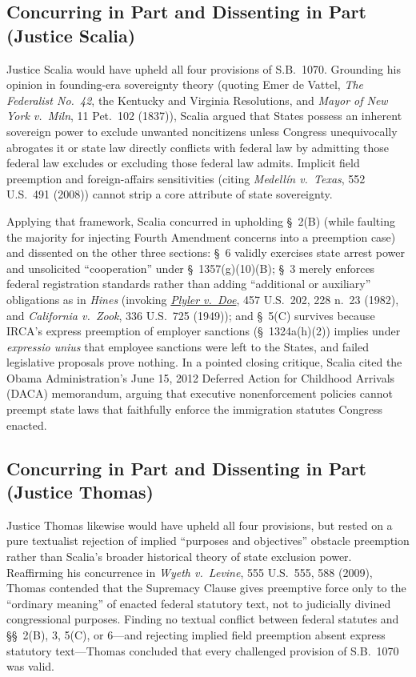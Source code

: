 \documentclass[12pt]{article}
\begin{document}
\subsection{Concurring in Part and Dissenting in Part (Justice Scalia)}

Justice Scalia would have upheld all four provisions of S.B.\ 1070. Grounding his opinion in founding-era sovereignty theory (quoting Emer de Vattel, \textit{The Federalist No.\ 42}, the Kentucky and Virginia Resolutions, and \textit{Mayor of New York v.\ Miln}, 11 Pet.\ 102 (1837)), Scalia argued that States possess an inherent sovereign power to exclude unwanted noncitizens unless Congress unequivocally abrogates it or state law directly conflicts with federal law by admitting those federal law excludes or excluding those federal law admits. Implicit field preemption and foreign-affairs sensitivities (citing \textit{Medell\'{i}n v.\ Texas}, 552 U.S.\ 491 (2008)) cannot strip a core attribute of state sovereignty.

Applying that framework, Scalia concurred in upholding \S~2(B) (while faulting the majority for injecting Fourth Amendment concerns into a preemption case) and dissented on the other three sections: \S~6 validly exercises state arrest power and unsolicited ``cooperation'' under \S~1357(g)(10)(B); \S~3 merely enforces federal registration standards rather than adding ``additional or auxiliary'' obligations as in \textit{Hines} (invoking \href{https://supreme.justia.com/cases/federal/us/457/202/}{\textit{Plyler v.\ Doe}}, 457 U.S.\ 202, 228 n.\ 23 (1982), and \textit{California v.\ Zook}, 336 U.S.\ 725 (1949)); and \S~5(C) survives because IRCA's express preemption of employer sanctions (\S~1324a(h)(2)) implies under \textit{expressio unius} that employee sanctions were left to the States, and failed legislative proposals prove nothing. In a pointed closing critique, Scalia cited the Obama Administration's June 15, 2012 Deferred Action for Childhood Arrivals (DACA) memorandum, arguing that executive nonenforcement policies cannot preempt state laws that faithfully enforce the immigration statutes Congress enacted.

\subsection{Concurring in Part and Dissenting in Part (Justice Thomas)}

Justice Thomas likewise would have upheld all four provisions, but rested on a pure textualist rejection of implied ``purposes and objectives'' obstacle preemption rather than Scalia's broader historical theory of state exclusion power. Reaffirming his concurrence in \textit{Wyeth v.\ Levine}, 555 U.S.\ 555, 588 (2009), Thomas contended that the Supremacy Clause gives preemptive force only to the ``ordinary meaning'' of enacted federal statutory text, not to judicially divined congressional purposes. Finding no textual conflict between federal statutes and \S\S~2(B), 3, 5(C), or 6---and rejecting implied field preemption absent express statutory text---Thomas concluded that every challenged provision of S.B.\ 1070 was valid.
\end{document}
